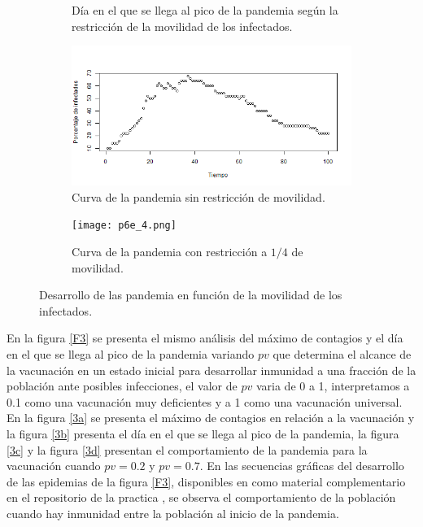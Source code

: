 \documentclass{article}
\begin{document}
\begin{figure}
\begin{subfigure}[]{.4\linewidth}
         \caption{Día en el que se llega al pico de la pandemia según la restricción de la movilidad de los infectados.}
         \label{fig2b}
     \end{subfigure}
     \begin{subfigure}[]{.5\linewidth}
     \centering
         \includegraphics[width=\linewidth]{p6_1.png}
         \caption{Curva de la pandemia sin restricción de movilidad.}
         \label{fig2c}
     \end{subfigure}
     \begin{subfigure}[]{.5\linewidth}
     \centering
         \texttt{[image: p6e\_4.png]}
         \caption{Curva de la pandemia con restricción a $1/4$ de movilidad.}
         \label{fig2d}
     \end{subfigure}
     \caption{Desarrollo de las pandemia en función de la movilidad de los infectados.}
        \label{F2}
\end{figure}
En la figura \ref{F3} se presenta el mismo análisis del máximo de contagios y el día en el que se llega al pico de la pandemia variando $pv$ que determina el alcance de la vacunación en un estado inicial para desarrollar inmunidad a una fracción de la población ante posibles infecciones, el valor de $pv$ varia de 0 a 1, interpretamos a 0.1 como una vacunación muy deficientes y a 1 como una vacunación universal. En la figura \ref{3a} se presenta el máximo de contagios en relación a la vacunación y la figura \ref{3b} presenta el día en el que se llega al pico de la pandemia, la figura \ref{3c} y la figura \ref{3d} presentan el comportamiento de la pandemia para la vacunación cuando $pv=0.2$ y $pv=0.7$. En las secuencias gráficas del desarrollo de las epidemias de la figura \ref{F3}, disponibles en como material complementario en el repositorio de la practica \citep{REPOP6}, se observa el comportamiento de la población cuando hay inmunidad entre la población al inicio de la pandemia.
\end{document}

